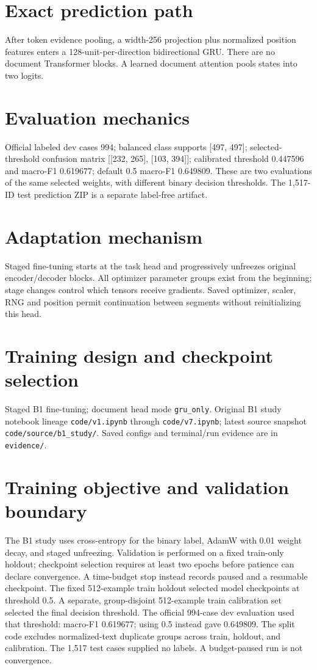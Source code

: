 \documentclass[11pt,a4paper]{article}
\begin{document}
\section{Exact prediction path}
After token evidence pooling, a width-256 projection plus normalized position features enters a 128-unit-per-direction bidirectional GRU. There are no document Transformer blocks. A learned document attention pools states into two logits.
\section{Evaluation mechanics}
Official labeled dev cases 994; balanced class supports [497, 497]; selected-threshold confusion matrix [[232, 265], [103, 394]]; calibrated threshold 0.447596 and macro-F1 0.619677; default 0.5 macro-F1 0.649809. These are two evaluations of the same selected weights, with different binary decision thresholds. The 1,517-ID test prediction ZIP is a separate label-free artifact.
\section{Adaptation mechanism}
Staged fine-tuning starts at the task head and progressively unfreezes original encoder/decoder blocks. All optimizer parameter groups exist from the beginning; stage changes control which tensors receive gradients. Saved optimizer, scaler, RNG and position permit continuation between segments without reinitializing this head.
\section{Training design and checkpoint selection}
Staged B1 fine-tuning; document head mode \texttt{gru\_only}. Original B1 study notebook lineage \texttt{code/v1.ipynb} through \texttt{code/v7.ipynb}; latest source snapshot \texttt{code/source/b1\_study/}. Saved configs and terminal/run evidence are in \texttt{evidence/}.
\section{Training objective and validation boundary}
The B1 study uses cross-entropy for the binary label, AdamW with 0.01 weight decay, and staged unfreezing. Validation is performed on a fixed train-only holdout; checkpoint selection requires at least two epochs before patience can declare convergence. A time-budget stop instead records paused and a resumable checkpoint. The fixed 512-example train holdout selected model checkpoints at threshold 0.5. A separate, group-disjoint 512-example train calibration set selected the final decision threshold. The official 994-case dev evaluation used that threshold: macro-F1 0.619677; using 0.5 instead gave 0.649809. The split code excludes normalized-text duplicate groups across train, holdout, and calibration. The 1,517 test cases supplied no labels. A budget-paused run is not convergence.
\end{document}
